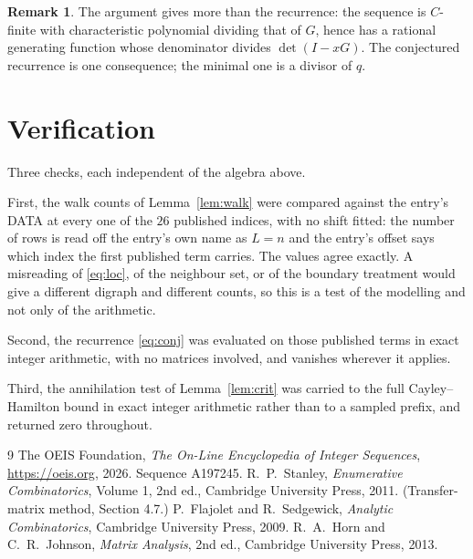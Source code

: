 \documentclass[11pt,a4paper]{article}
\theoremstyle{plain}
\theoremstyle{definition}
\newtheorem{remark}[theorem]{Remark}
\begin{document}
\begin{remark}
The argument gives more than the recurrence: the sequence is $C$-finite with characteristic
polynomial dividing that of $G$, hence has a rational generating function whose denominator
divides $\det(I-xG)$. The conjectured recurrence is one consequence; the minimal one is a
divisor of $q$.
\end{remark}

\section{Verification}

Three checks, each independent of the algebra above.

First, the walk counts of Lemma~\ref{lem:walk} were compared against the entry's DATA at
every one of the $26$ published indices, with no shift fitted: the number of rows is
read off the entry's own name as $L=n$ and the entry's offset says which index the first
published term carries. The values agree exactly. A misreading of \eqref{eq:loc}, of the
neighbour set, or of the boundary treatment would give a different digraph and different
counts, so this is a test of the modelling and not only of the arithmetic.

Second, the recurrence \eqref{eq:conj} was evaluated on those published terms in exact
integer arithmetic, with no matrices involved, and vanishes wherever it applies.

Third, the annihilation test of Lemma~\ref{lem:crit} was carried to the full
Cayley--Hamilton bound in exact integer arithmetic rather than to a sampled prefix, and
returned zero throughout.

\begin{thebibliography}{9}
 The OEIS Foundation, \emph{The On-Line Encyclopedia of Integer
Sequences}, \url{https://oeis.org}, 2026. Sequence A197245.
 R.~P.~Stanley, \emph{Enumerative Combinatorics}, Volume 1, 2nd ed.,
Cambridge University Press, 2011. (Transfer-matrix method, Section 4.7.)
 P.~Flajolet and R.~Sedgewick, \emph{Analytic Combinatorics}, Cambridge
University Press, 2009.
 R.~A.~Horn and C.~R.~Johnson, \emph{Matrix Analysis}, 2nd ed., Cambridge
University Press, 2013.
\end{thebibliography}
\end{document}

